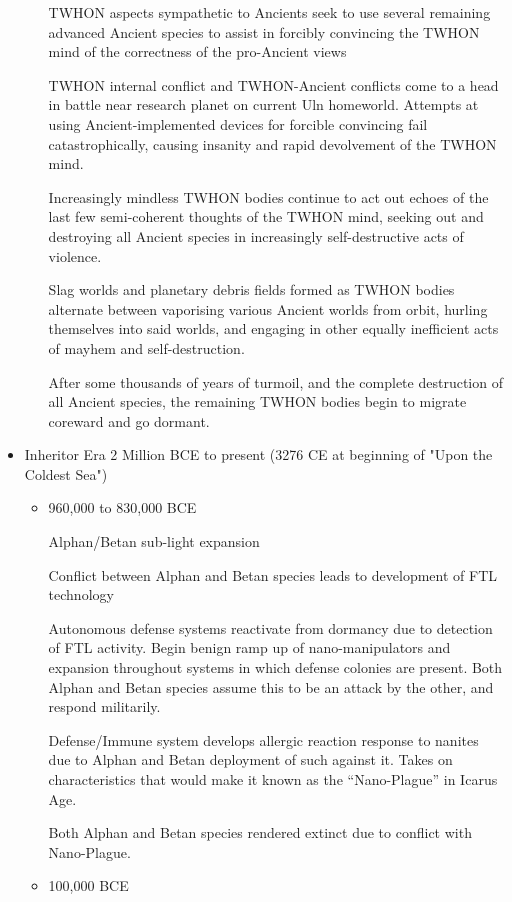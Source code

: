 \begin{itemize}
\begin{itemize}
TWHON aspects sympathetic to Ancients seek to use several remaining
advanced Ancient species to assist in forcibly convincing the TWHON
mind of the correctness of the pro-Ancient views

TWHON internal conflict and TWHON-Ancient conflicts come to a head in
battle near research planet on current Uln homeworld. Attempts at
using Ancient-implemented devices for forcible convincing fail
catastrophically, causing insanity and rapid devolvement of the TWHON
mind.

Increasingly mindless TWHON bodies continue to act out echoes of the
last few semi-coherent thoughts of the TWHON mind, seeking out and
destroying all Ancient species in increasingly self-destructive acts
of violence.

Slag worlds and planetary debris fields formed as TWHON bodies
alternate between vaporising various Ancient worlds from orbit,
hurling themselves into said worlds, and engaging in other equally
inefficient acts of mayhem and self-destruction.

After some thousands of years of turmoil, and the complete destruction
of all Ancient species, the remaining TWHON bodies begin to migrate
coreward and go dormant.

\end{itemize}
\item Inheritor Era  2 Million BCE to present (3276 CE at beginning of "Upon the Coldest Sea")
\begin{itemize}
\item	 960,000 to  830,000 BCE 

Alphan/Betan sub-light expansion 

Conflict between Alphan and Betan species leads to development of FTL technology 

Autonomous defense systems reactivate from dormancy due to detection
of FTL activity. Begin benign ramp up of nano-manipulators and
expansion throughout systems in which defense colonies are present.
Both Alphan and Betan species assume this to be an attack by the
other, and respond militarily.

Defense/Immune system develops allergic reaction response to nanites
due to Alphan and Betan deployment of such against it. Takes on
characteristics that would make it known as the ``Nano-Plague'' in Icarus Age.

Both Alphan and Betan species rendered extinct due to conflict with Nano-Plague. 
\item	 100,000 BCE 


\end{itemize}
\end{itemize}
